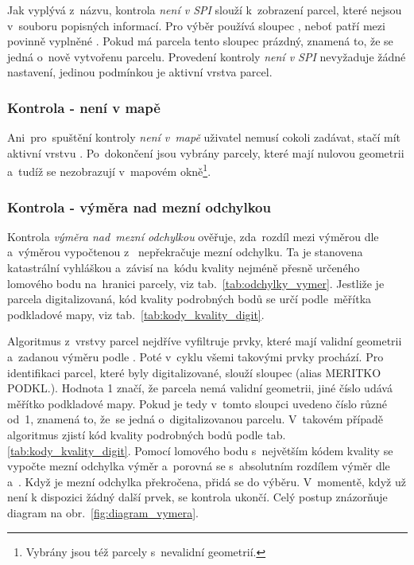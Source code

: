 Jak vyplývá z~názvu, kontrola \textit{není v SPI} slouží k~zobrazení parcel, které nejsou v~souboru popisných informací. Pro výběr používá sloupec , neboť patří mezi povinně vyplněné \citep{struktura_vfk}. Pokud má parcela tento sloupec prázdný, znamená to, že se jedná o~nově vytvořenu parcelu. Provedení kontroly \textit{není v SPI} nevyžaduje žádné nastavení, jedinou podmínkou je aktivní vrstva parcel.

\subsubsection{Kontrola - není v mapě}
\label{kontrola_neni_v_mape}

Ani~pro~spuštění kontroly \textit{není v~mapě} uživatel nemusí cokoli zadávat, stačí mít aktivní vrstvu . Po~dokončení jsou vybrány parcely, které mají nulovou geometrii a~tudíž se nezobrazují v~mapovém okně\footnote{Vybrány jsou též parcely s~nevalidní geometrií.}.

\subsubsection{Kontrola - výměra nad mezní odchylkou}
\label{kontrola_vymera}

Kontrola \textit{výměra nad~mezní odchylkou} ověřuje, zda~rozdíl mezi výměrou dle~ a~výměrou vypočtenou z~ nepřekračuje mezní odchylku. Ta je stanovena katastrální vyhláškou \citep{vyhlaska_357} a~závisí na~kódu kvality nejméně přesně určeného lomového bodu na~hranici parcely, viz tab.~\ref{tab:odchylky_vymer}. Jestliže je parcela digitalizovaná, kód kvality podrobných bodů se určí podle~měřítka podkladové mapy, viz tab.~\ref{tab:kody_kvality_digit}.

Algoritmus z~vrstvy parcel nejdříve vyfiltruje prvky, které mají validní geometrii a~zadanou výměru podle . Poté v~cyklu všemi takovými prvky prochází. Pro identifikaci parcel, které byly digitalizované, slouží sloupec  (alias MERITKO PODKL.). Hodnota 1 značí, že parcela nemá validní geometrii, jiné číslo udává měřítko podkladové mapy. Pokud je tedy v~tomto sloupci uvedeno číslo různé od~1, znamená to, že~se jedná o~digitalizovanou parcelu. V~takovém případě algoritmus zjistí kód kvality podrobných bodů podle tab. \ref{tab:kody_kvality_digit}. Pomocí lomového bodu s~největším kódem kvality se vypočte mezní odchylka výměr a~porovná se s~absolutním rozdílem výměr dle~ a~. Když je mezní odchylka překročena, přidá se do výběru. V~momentě, když už není k dispozici žádný další prvek, se kontrola ukončí. Celý postup znázorňuje diagram na obr.~\ref{fig:diagram_vymera}.

